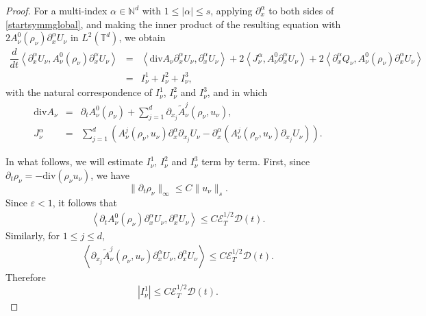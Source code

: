 \documentclass[reqno,twoside,12pt,a4paper]{amsart}
\newcommand{\N}{\mathbb{N}}
\newcommand{\T}{\mathbb{T}}
\newcommand{\eps}{\mathbb{\varepsilon}}
\newcommand{\al}{\alpha}
\newcommand{\dive}{\mathrm{div}}
\newcommand{\pt}{\partial_t}
\newcommand{\pa}{\partial}
\newcommand{\cubic}{C\mathscr{E}_T^{1/2}\mathscr{D}(t)}
\numberwithin{equation}{section}
\begin{document}
\begin{proof} For a multi-index $\alpha\in\N^d$ with $1\leq |\alpha|\leq s$, applying $\pa_x^\al$ to both sides of \eqref{startsymmglobal}, and making the inner product of the resulting equation with $2A_\nu^0(\rho_\nu) \pa_x^\al U_\nu$ in $L^2(\T^d)$, we obtain
\begin{eqnarray}\label{starthigher}
\dfrac{d}{dt}\left<\pa_x^\al U_\nu, A_\nu^0(\rho_\nu)\pa_x^\al U_\nu\right> &=&\left<\dive A_\nu \pa_x^\al U_\nu, \pa_x^\al U_\nu\right> +2\left<J_\nu^\al, A_\nu^0\pa_x^\al U_\nu\right> +2\left<\pa_x^\al Q_\nu, A_\nu^0(\rho_\nu)\pa_x^\al U_\nu \right>\nonumber\\
&=&I_\nu^1+I_\nu^2+I_\nu^3,
\end{eqnarray}
with the natural correspondence of $I_\nu^1$, $I_\nu^2$ and $I_\nu^3$, and
in which
\begin{eqnarray*}
\dive A_\nu &=&\pt A_\nu^0(\rho_\nu)+\sum_{j=1}^d \pa_{x_j}\tilde{A}_\nu^j(\rho_\nu, u_\nu),\nonumber\\
J_\nu^\al&=&\sum_{j=1}^d(A_\nu^j(\rho_\nu,u_\nu)\pa_x^\al \pa_{x_j}U_\nu-\pa_x^\al (A_\nu^j(\rho_\nu,u_\nu)\pa_{x_j}U_\nu)).
\end{eqnarray*}


In what follows, we will estimate $I_\nu^1$, $I_\nu^2$ and $I_\nu^3$ term by term. First, since $\pt \rho_\nu=-\dive(\rho_\nu u_\nu)$, we have
\[
\|\pt \rho_\nu\|_{\infty}\leq C\|u_\nu\|_s.
\]
Since $\eps< 1$, it follows that
\begin{eqnarray*}
\left<\pt A_\nu^0(\rho_\nu)\pa_x^\al U_\nu, \pa_x^\al U_\nu\right> \leq\cubic.
\end{eqnarray*}
Similarly, for $1\leq j\leq d$,
\begin{eqnarray*}
\left<\pa_{x_j}\tilde{A}_\nu^j (\rho_\nu, u_\nu)\pa_x^\al U_\nu, \pa_x^\al U_\nu\right>\leq \cubic.
\end{eqnarray*}
Therefore
\begin{equation}\label{I1}
|I_\nu^1|\leq \cubic.
\end{equation}


\end{proof}
\end{document}
